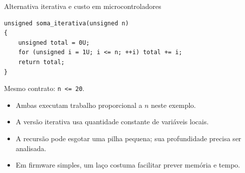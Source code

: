 \begin{frame}[fragile]{Alternativa iterativa e custo em microcontroladores}
\begin{lstlisting}
unsigned soma_iterativa(unsigned n)
{
    unsigned total = 0U;
    for (unsigned i = 1U; i <= n; ++i) total += i;
    return total;
}
\end{lstlisting}
\small Mesmo contrato: \texttt{n <= 20}.
\begin{itemize}
\item Ambas executam trabalho proporcional a $n$ neste exemplo.
\item A versão iterativa usa quantidade constante de variáveis locais.
\item A recursão pode esgotar uma pilha pequena; sua profundidade precisa ser analisada.
\item Em firmware simples, um laço costuma facilitar prever memória e tempo.
\end{itemize}
\end{frame}
